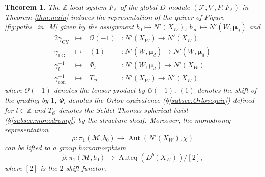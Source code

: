 \documentclass[11pt]{amsart}
\newtheorem{thm}{Theorem}[section] %
\theoremstyle{definition} %
\theoremstyle{remark} %
\newcommand{\ZZ}{\mathbb Z}
\newcommand{\Aut}{\operatorname{Aut}}
\newcommand{\bmu}{\boldsymbol{\mu}}
\newcommand{\cO}{\mathcal{O}}
\newcommand{\cM}{\mathcal{M}}
\newcommand{\cF}{\mathcal{F}}
\newcommand{\hrho}{\hat{\rho}}
\newcommand{\Auteq}{\operatorname{Auteq}}
\newcommand{\CY}{\operatorname{CY}}
\newcommand{\LG}{\operatorname{LG}}
\newcommand{\con}{\operatorname{con}}
\begin{document}
\begin{thm}
\label{thm:monodromyrep} 
The $\ZZ$-local system $F_\ZZ$ of the global $D$-module 
$(\cF,\nabla,P,F_\ZZ)$ in Theorem \ref{thm:main} 
induces the representation of the quiver of Figure \ref{fig:paths_in_M} 
given by the assignment $b_0 \mapsto N'(X_W)$, 
$b_\infty\mapsto N'(W,\bmu_d)$ and   
\begin{alignat*}{2} 
\gamma_{\CY} &  \longmapsto  \ &  \cO(-1) & 
\colon  N'(X_W) \to N'(X_W) \\ 
\gamma_{\LG} &  \longmapsto  \ &(1) & 
\colon  N'(W,\bmu_d) \to N'(W,\bmu_d) \\ 
\gamma_l^{-1} &  \longmapsto  \ & \Phi_l & 
\colon  N'(W,\bmu_d) \to N'(X_W) \\ 
\gamma_{\con}^{-1} & \longmapsto \ & T_\cO & 
\colon N'(X_W) \to N'(X_W) 
\end{alignat*} 
where $\cO(-1)$ denotes the tensor product by $\cO(-1)$, 
$(1)$ denotes the shift of the grading by $1$,  
$\Phi_l$ denotes the Orlov equivalence (\S \ref{subsec:Orlovequiv}) 
defined for $l\in \ZZ$ and 
$T_\cO$ denotes the Seidel-Thomas spherical twist 
(\S \ref{subsec:monodromy}) by the structure sheaf. 
Moreover, the monodromy representation 
\[
\rho \colon \pi_1(\cM, b_0) \to \Aut(N'(X_W),\chi)
\]
can be lifted to a group homomorphism 
\[
\hrho \colon \pi_1(\cM,b_0)
\to \Auteq(D^b(X_W))/[2], 
\] 
where $[2]$ is the $2$-shift functor. 
\end{thm} 
\end{document}
